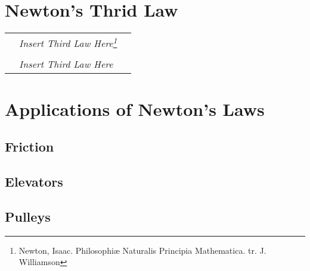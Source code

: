 	\section{Newton's Thrid Law}
		\begin{tabular}{p{1in} p{4in} p{1in}}
		& \textit{Insert Third Law Here\footnote{Newton, Isaac.  Philosophiæ Naturalis Principia Mathematica.  tr. J. Williamson}} &  \\
		& & \\
		& \textit{Insert Third Law Here } &
		
	\end{tabular}
	
	\section{Applications of Newton's Laws}
		\subsection{Friction}
		\subsection{Elevators}
		\subsection{Pulleys}
		


	


